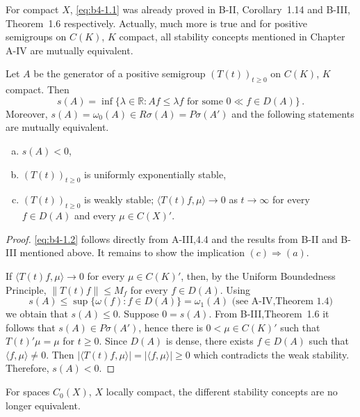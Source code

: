 For compact $X$, \eqref{eq:b4-1.1} was already proved in B-II, Corollary~1.14 and B-III, Theorem~1.6 respectively. 
Actually, much more is true and for positive semigroups on $C(K)$, $K$ compact, all stability concepts mentioned in Chapter A-IV are mutually equivalent.

\begin{theorem}\label{thm:b4-1.1}
Let $A$ be the generator of a positive semigroup $(T(t))_{t \geq 0}$ on $C(K)$, $K$ compact. Then
\begin{equation}\label{eq:b4-1.2}
   s(A) = \inf \{\lambda \in \mathbb{R} \colon Af \leq \lambda f \text{ for some } 0 \ll f \in D(A)\}\,.
\end{equation}
Moreover, $s(A) = \omega_{0}(A) \in R\sigma(A) = P\sigma(A')$ and the following statements are mutually equivalent.
\begin{enumerate}[(a)]
\item $s(A) < 0$,
\item $(T(t))_{t \geq 0}$ is uniformly exponentially stable,
\item $(T(t))_{t \geq 0}$ is weakly stable; \ie $\langle T(t)f,\mu \rangle \to 0$ as $t \to \infty$ for every $f \in D(A)$ and every $\mu \in C(X)'$.
\end{enumerate}
\end{theorem}
\begin{proof}
\eqref{eq:b4-1.2} follows directly from A-III,4.4 and the results from B-II and B-III mentioned above. 
It remains to show the implication $(c) \Rightarrow (a)$.

If $\langle T(t)f,\mu \rangle \to 0$ for every $\mu \in C(K)'$, then, by the Uniform Boundedness Principle, $\|T(t)f\| \leq M_f$ for every $f \in D(A)$.
Using 
\[
s(A) \leq \sup \{\omega(f)\colon f \in D(A)\} = \omega_1(A)
\text{ (see A-IV,Theorem~1.4)}
\]
we obtain that $s(A) \leq 0$. 
Suppose $0 = s(A)$. 
From B-III,Theorem~1.6 it follows that $s(A) \in P\sigma(A')$, hence there is $0 < \mu \in C(K)'$ such that $T(t)'\mu = \mu$ for $t \geq 0$. 
Since $D(A)$ is dense, there exists $f \in D(A)$ such that $\langle f,\mu \rangle \neq 0$. 
Then $|\langle T(t)f,\mu \rangle| = |\langle f,\mu \rangle|  \ge  0$ which contradicts the weak stability. Therefore, $s(A) < 0$.
\end{proof}
For spaces $C_{0}(X)$, $X$ locally compact, the different stability concepts are no longer equivalent.
%
%

